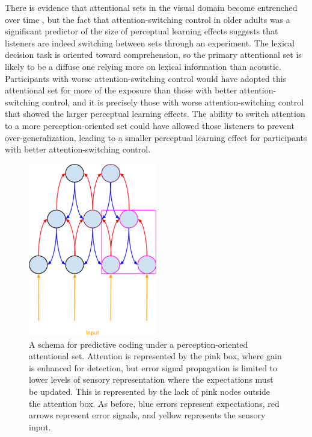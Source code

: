There is evidence that attentional sets in the visual domain become entrenched over time \cite{Leber2006}, but the fact that attention-switching control in older adults was a significant predictor of the size of perceptual learning effects \citep{Scharenborg2014} suggests that listeners are indeed switching between sets through an experiment.
The lexical decision task is oriented toward comprehension, so the primary attentional set is likely to be a diffuse one relying more on lexical information than acoustic.
Participants with worse attention-switching control would have adopted this attentional set for more of the exposure than those with better attention-switching control, and it is precisely those with worse attention-switching control that showed the larger perceptual learning effects.
The ability to switch attention to a more perception-oriented set could have allowed those listeners to prevent over-generalization, leading to a smaller perceptual learning effect for participants with better attention-switching control.

\begin{figure}[!ht]
\caption{A schema for predictive coding under a perception-oriented attentional set.  Attention is represented by the pink box, where gain is enhanced for detection, but error signal propagation is limited to lower levels of sensory representation where the expectations must be updated.  This is represented by the lack of pink nodes outside the attention box.  As before, blue errors represent expectations, red arrows represent error signals, and yellow represents the sensory input.}
\label{fig:predictivecodingperception}
\begin{center}
\includegraphics[width=0.5\textwidth]{pictures/perception_predictive_coding}
\end{center}
\end{figure}

